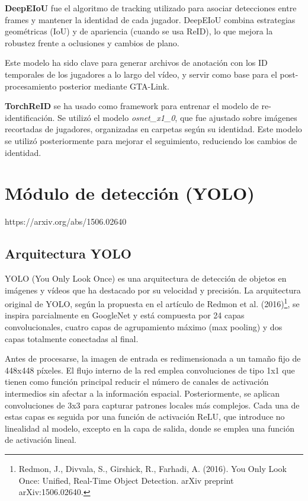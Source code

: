\documentclass[12pt, a4paper, twoside]{article}
\begin{document}
	\textbf{DeepEIoU} fue el algoritmo de tracking utilizado para asociar detecciones entre frames y mantener la identidad de cada jugador. DeepEIoU combina estrategias geométricas (IoU) y de apariencia (cuando se usa ReID), lo que mejora la robustez frente a oclusiones y cambios de plano.
	
	Este modelo ha sido clave para generar archivos de anotación con los ID temporales de los jugadores a lo largo del vídeo, y servir como base para el post-procesamiento posterior mediante GTA-Link.
	
	\textbf{TorchReID} se ha usado como framework para entrenar el modelo de re-identificación. Se utilizó el modelo \textit{osnet\_x1\_0}, que fue ajustado sobre imágenes recortadas de jugadores, organizadas en carpetas según su identidad. Este modelo se utilizó posteriormente para mejorar el seguimiento, reduciendo los cambios de identidad.
	
	
	
	\section{Módulo de detección (YOLO)}
	https://arxiv.org/abs/1506.02640
	
	\subsection{Arquitectura YOLO}
	
	YOLO (You Only Look Once) es una arquitectura de detección de objetos en imágenes y vídeos que ha destacado por su velocidad y precisión. La arquitectura original de YOLO, según la propuesta en el artículo de Redmon et al. (2016)\footnote{Redmon, J., Divvala, S., Girshick, R.,  Farhadi, A. (2016). You Only Look Once: Unified, Real-Time Object Detection. arXiv preprint arXiv:1506.02640.}, se inspira parcialmente en GoogleNet y está compuesta por 24 capas convolucionales, cuatro capas de agrupamiento máximo (max pooling) y dos capas totalmente conectadas al final.
	
	Antes de procesarse, la imagen de entrada es redimensionada a un tamaño fijo de 448x448 píxeles. El flujo interno de la red emplea convoluciones de tipo 1x1 que tienen como función principal reducir el número de canales de activación intermedios sin afectar a la información espacial. Posteriormente, se aplican convoluciones de 3x3 para capturar patrones locales más complejos. Cada una de estas capas es seguida por una función de activación ReLU, que introduce no linealidad al modelo, excepto en la capa de salida, donde se emplea una función de activación lineal.
	
\end{document}
